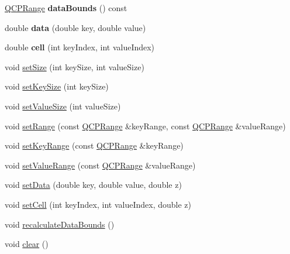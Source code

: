\begin{DoxyCompactItemize}
\item 
\hypertarget{classQCPColorMapData_a9ff433248ee226ea0c469ae6cc2489fd}{\hyperlink{classQCPRange}{\-Q\-C\-P\-Range} {\bfseries data\-Bounds} () const }\label{classQCPColorMapData_a9ff433248ee226ea0c469ae6cc2489fd}

\item 
\hypertarget{classQCPColorMapData_a2c33807b008cdb9e1394245c294c0eaf}{double {\bfseries data} (double key, double value)}\label{classQCPColorMapData_a2c33807b008cdb9e1394245c294c0eaf}

\item 
\hypertarget{classQCPColorMapData_af51ecd21f347adbf87b4cce4e1f5cbd6}{double {\bfseries cell} (int key\-Index, int value\-Index)}\label{classQCPColorMapData_af51ecd21f347adbf87b4cce4e1f5cbd6}

\item 
void \hyperlink{classQCPColorMapData_a0d9ff35c299d0478b682bfbcdd9c097e}{set\-Size} (int key\-Size, int value\-Size)
\item 
void \hyperlink{classQCPColorMapData_ac7ef70e383aface34b44dbde49234b6b}{set\-Key\-Size} (int key\-Size)
\item 
void \hyperlink{classQCPColorMapData_a0893c9e3914513048b45e3429ffd16f2}{set\-Value\-Size} (int value\-Size)
\item 
void \hyperlink{classQCPColorMapData_aad9c1c7c703c1339489fc730517c83d4}{set\-Range} (const \hyperlink{classQCPRange}{\-Q\-C\-P\-Range} \&key\-Range, const \hyperlink{classQCPRange}{\-Q\-C\-P\-Range} \&value\-Range)
\item 
void \hyperlink{classQCPColorMapData_a0738c485f3c9df9ea1241b7a8bb6a86e}{set\-Key\-Range} (const \hyperlink{classQCPRange}{\-Q\-C\-P\-Range} \&key\-Range)
\item 
void \hyperlink{classQCPColorMapData_ada1b2680ba96a5f4175b6d341cf75d23}{set\-Value\-Range} (const \hyperlink{classQCPRange}{\-Q\-C\-P\-Range} \&value\-Range)
\item 
void \hyperlink{classQCPColorMapData_afd2083ccfd6987ec94aa7ef8e91ca39a}{set\-Data} (double key, double value, double z)
\item 
void \hyperlink{classQCPColorMapData_a8e75eaf8746596319032a93f3d2d0683}{set\-Cell} (int key\-Index, int value\-Index, double z)
\item 
void \hyperlink{classQCPColorMapData_ab235ade8a4d64bd3adb26a99b3dd57ee}{recalculate\-Data\-Bounds} ()
\item 
void \hyperlink{classQCPColorMapData_a9910ba830e96955bd5c8e5bef1e77ef3}{clear} ()

\end{DoxyCompactItemize}
